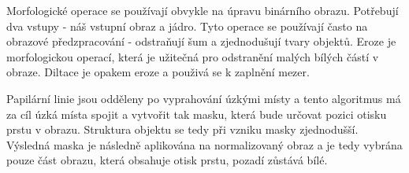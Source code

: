 Morfologické operace se používají obvykle na úpravu binárního obrazu. Potřebují dva vstupy - náš vstupní obraz a jádro.\cite{OpenCVMorphology} Tyto operace se používají často na obrazové předzpracování - odstraňují šum a zjednodušují tvary objektů. Eroze je morfologickou operací, která je užitečná pro odstranění malých bílých částí v obraze. Diltace je opakem eroze a použivá se k zaplnění mezer.\cite{ExerciseMorphology}

Papilární linie jsou odděleny po vyprahování úzkými místy a tento algoritmus má za cíl úzká místa spojit a vytvořit tak masku, která bude určovat pozici otisku prstu v obrazu. Struktura objektu se tedy při vzniku masky zjednodušší. Výsledná maska je následně aplikována na normalizovaný obraz a je tedy vybrána pouze část obrazu, která obsahuje otisk prstu, pozadí zůstává bílé.

